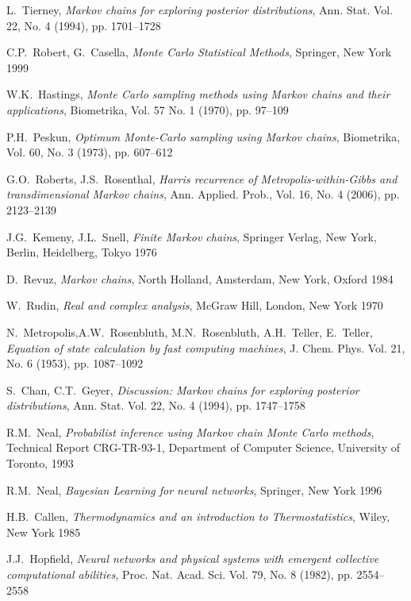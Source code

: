 \documentclass[a4paper, draft]{article}
\theoremstyle{own}
\theoremstyle{remark}
\begin{document}
\begin{thebibliography}{9}
L.~Tierney, 
{\em Markov chains for exploring posterior distributions},
Ann. Stat. Vol. 22, No. 4 (1994), pp. 1701--1728

C.P.~Robert, G.~Casella,
{\em Monte Carlo Statistical Methods},
Springer, New York 1999


W.K.~Hastings,
{\em Monte Carlo sampling methods using Markov chains and their applications},
Biometrika, Vol. 57 No. 1 (1970), pp. 97--109


P.H.~Peskun,
{\em Optimum Monte-Carlo sampling using Markov chains},
Bio\-metrika, Vol. 60, No. 3 (1973), pp. 607--612

G.O.~Roberts, J.S.~Rosenthal,
{\em Harris recurrence of Metropolis-within-Gibbs and transdimensional Markov chains},
Ann. Applied. Prob., Vol. 16, No. 4 (2006), pp. 2123--2139

J.G.~Kemeny, J.L.~Snell,
{\em Finite Markov chains},
Springer Verlag, New York, Berlin, Heidelberg, Tokyo 1976

D.~Revuz,
{\em Markov chains},
North Holland, Amsterdam, New York, Oxford 1984


W.~Rudin,
{\em Real and complex analysis},
McGraw Hill, London, New York 1970

N.~Metropolis,A.W.~Rosenbluth, M.N.~Rosenbluth, A.H.~Teller, E.~Teller,
{\em Equation of state calculation by fast computing machines},
J. Chem. Phys. Vol. 21, No. 6 (1953), pp. 1087--1092

S.~Chan, C.T.~Geyer,
{\em Discussion: Markov chains for exploring posterior distributions},
Ann. Stat. Vol. 22, No. 4 (1994), pp. 1747--1758


R.M.~Neal, 
{\em Probabilist inference using Markov chain Monte Carlo methods}, 
Technical Report CRG-TR-93-1, Department of Computer Science, University of Toronto, 1993

R.M.~Neal,
{\em Bayesian Learning for neural networks},
Springer, New York 1996


H.B.~Callen,
{\em Thermodynamics and an introduction to Thermostatistics},
Wiley, New York 1985

J.J.~Hopfield,
{\em Neural networks and physical systems with emergent collective computational
	abilities},
Proc. Nat. Acad. Sci. Vol. 79, No. 8 (1982), pp. 2554--2558


\end{thebibliography}
\end{document}
